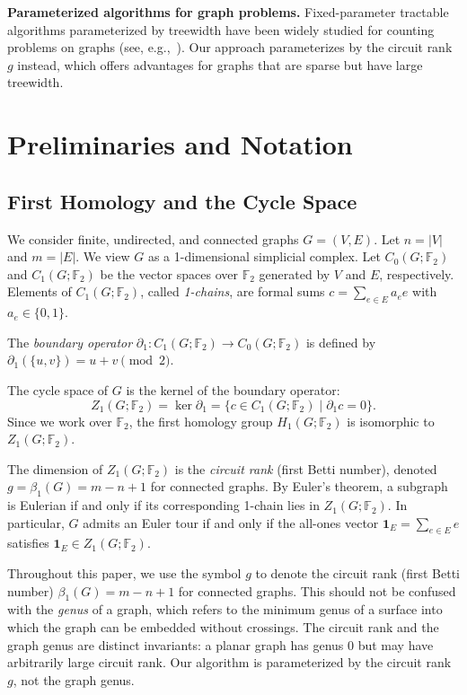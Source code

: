 \documentclass[acmsmall,review]{acmart}
\newcommand{\onevec}{\mathbf{1}}
\newcommand{\F}{\mathbb{F}_2}
\begin{document}
	\textbf{Parameterized algorithms for graph problems.} Fixed-parameter tractable algorithms parameterized by treewidth have been widely studied for counting problems on graphs (see, e.g.,~\cite{CyganFKLMPPS15}). Our approach parameterizes by the circuit rank~$g$ instead, which offers advantages for graphs that are sparse but have large treewidth.
	
	\section{Preliminaries and Notation}
	\label{sec:preliminaries}
	
	\subsection{First Homology and the Cycle Space}
	We consider finite, undirected, and connected graphs $G=(V, E)$. Let $n = |V|$ and $m = |E|$. We view $G$ as a 1-dimensional simplicial complex. Let $C_0(G; \F)$ and $C_1(G; \F)$ be the vector spaces over $\F$ generated by $V$ and $E$, respectively. Elements of $C_1(G; \F)$, called \emph{1-chains}, are formal sums $c = \sum_{e \in E} a_e e$ with $a_e \in \{0, 1\}$.
	
	The \emph{boundary operator} $\partial_1: C_1(G; \F) \to C_0(G; \F)$ is defined by $\partial_1(\{u, v\}) = u + v \pmod 2$.
	
	\begin{definition}
		The cycle space of $G$ is the kernel of the boundary operator:
		\[ Z_1(G; \F) = \ker \partial_1 = \{ c \in C_1(G; \F) \mid \partial_1 c = 0 \}. \]
		Since we work over $\F$, the first homology group $H_1(G; \F)$ is isomorphic to $Z_1(G; \F)$.
	\end{definition}
	
	The dimension of $Z_1(G; \F)$ is the \emph{circuit rank} (first Betti number), denoted $g = \beta_1(G) = m - n + 1$ for connected graphs. By Euler's theorem, a subgraph is Eulerian if and only if its corresponding 1-chain lies in $Z_1(G; \F)$. In particular, $G$ admits an Euler tour if and only if the all-ones vector $\onevec_{E} = \sum_{e \in E} e$ satisfies $\onevec_{E} \in Z_1(G; \F)$.
	
	\begin{remark}
		\label{rem:terminology}
		Throughout this paper, we use the symbol $g$ to denote the circuit rank (first Betti number) $\beta_1(G) = m - n + 1$ for connected graphs. This should not be confused with the \emph{genus} of a graph, which refers to the minimum genus of a surface into which the graph can be embedded without crossings. The circuit rank and the graph genus are distinct invariants: a planar graph has genus $0$ but may have arbitrarily large circuit rank. Our algorithm is parameterized by the circuit rank~$g$, not the graph genus.
	\end{remark}
	
\end{document}
